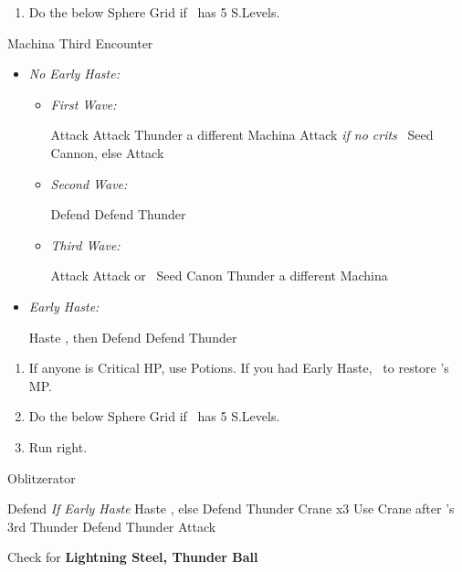 \begin{enumerate}[resume]
    \item Do the below Sphere Grid if \tidus\ has 5 S.Levels.
\end{enumerate}
\begin{battle}{Machina Third Encounter}
    \begin{itemize}
        \item \textit{No Early Haste:}
        \begin{itemize}
            \item \textit{First Wave:}
            \begin{itemize}
                \tidusf Attack
                \kimahrif Attack
                \luluf Thunder a different Machina
                \tidusf Attack
                \kimahrif \textit{if no crits} \od\ Seed Cannon, else Attack
            \end{itemize}
            \item \textit{Second Wave:}
            \begin{itemize}
                \tidusf Defend
                \kimahrif Defend
                \luluf Thunder
            \end{itemize}
            \item \textit{Third Wave:}
            \begin{itemize}
                \tidusf Attack
                \kimahrif Attack or \od\ Seed Canon
                \luluf Thunder a different Machina
            \end{itemize}
        \end{itemize}
        \item \textit{Early Haste:}
        \begin{itemize}
            \tidusf Haste \lulu, then Defend
            \kimahrif Defend
            \luluf Thunder
        \end{itemize}
    \end{itemize}
\end{battle}
\begin{enumerate}[resume]
    \item If anyone is Critical HP, use Potions. If you had Early Haste, \save\ to restore \tidus's MP.
    \item Do the below Sphere Grid if \tidus\ has 5 S.Levels.
    \item Run right.
\end{enumerate}
\begin{battle}[3000]{Oblitzerator}
    \begin{itemize}
        \kimahrif Defend
        \tidusf \textit{If Early Haste} Haste \lulu, else Defend
        \luluf Thunder Crane x3
        \tidusf Use Crane after \lulu's 3rd Thunder
        \kimahrif Defend
        \luluf Thunder
        \tidusf Attack
    \end{itemize}
    Check for \textbf{Lightning Steel, Thunder Ball}
\end{battle}

